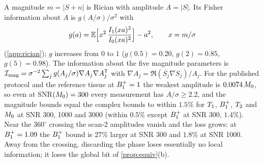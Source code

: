 A magnitude $m=|S+n|$ is Rician with amplitude $A=|S|$. Its Fisher information about $A$ is
$g(A/\sigma)/\sigma^2$ with
\begin{equation}
  g(a)=\mathbb E\Bigl[x^2\,\frac{I_1(xa)^2}{I_0(xa)^2}\Bigr]-a^2,\qquad x=m/\sigma
  \label{eq:rician}
\end{equation}
(\cref{app:rician}); $g$ increases from $0$ to $1$ ($g(0.5)=0.20$, $g(2)=0.85$, $g(5)=0.98$). The
information about the five magnitude parameters is
$\mathcal{I}_{\rm mag}=\sigma^{-2}\sum_jg(A_j/\sigma)\nabla A_j\nabla A_j^{\mathsf T}$ with
$\nabla A_j=\Re(\overline{S_j}\nabla S_j)/A_j$. For the published protocol and the reference
tissue at $B_1^{+}=1$ the weakest amplitude is $0.0074\,M_0$, so even at SNR$(M_0)=300$ every
measurement has $A/\sigma\ge2.2$, and the magnitude bounds equal the complex bounds to within
$1.5\%$ for $T_1$, $B_1^{+}$, $T_2$ and $M_0$ at SNR 300, 1000 and 3000 (within $0.5\%$ except $B_1^{+}$ at
SNR 300, $1.4\%$). Near the $360^\circ$ crossing the scan-2 amplitudes vanish and the loss grows: at
$B_1^{+}=1.09$ the $B_1^{+}$ bound is $27\%$ larger at SNR 300 and $1.8\%$ at SNR 1000. Away from the crossing,
discarding the phase loses essentially no local information; it loses the global bit of
\cref{prop:equiv}(b).
